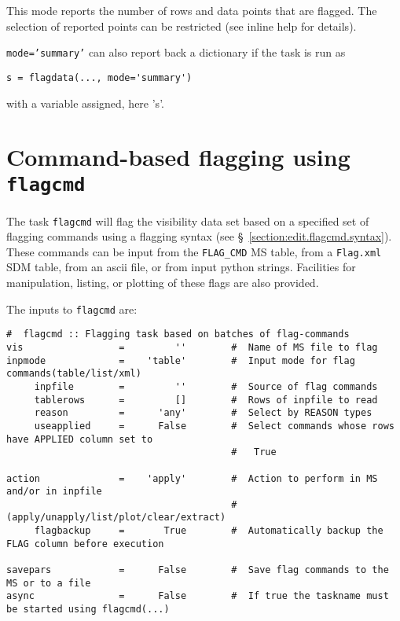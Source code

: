 This mode reports the number of rows and data points that are
flagged. The selection of reported points can be restricted (see
inline help for details).

{\tt mode='summary'} can also report back a dictionary if the task is run as 

\small
\begin{verbatim}
s = flagdata(..., mode='summary')
\end{verbatim}
\normalsize

with a variable assigned, here 's'.



\section{Command-based flagging using {\tt flagcmd}}
\label{section:edit.flagcmd}

The task {\tt flagcmd} will flag the visibility data set based on 
a specified set of flagging commands using a flagging 
syntax (see \S~\ref{section:edit.flagcmd.syntax}).  These commands
can be input from the {\tt FLAG\_CMD} MS table, from a 
{\tt Flag.xml} SDM table, from an ascii
file, or from input python strings.  Facilities for manipulation,
listing, or plotting of these flags are also provided.

The inputs to {\tt flagcmd} are:
\small
\begin{verbatim}
#  flagcmd :: Flagging task based on batches of flag-commands
vis                 =         ''        #  Name of MS file to flag
inpmode             =    'table'        #  Input mode for flag commands(table/list/xml)
     inpfile        =         ''        #  Source of flag commands
     tablerows      =         []        #  Rows of inpfile to read
     reason         =      'any'        #  Select by REASON types
     useapplied     =      False        #  Select commands whose rows have APPLIED column set to
                                        #   True

action              =    'apply'        #  Action to perform in MS and/or in inpfile
                                        #   (apply/unapply/list/plot/clear/extract)
     flagbackup     =       True        #  Automatically backup the FLAG column before execution

savepars            =      False        #  Save flag commands to the MS or to a file
async               =      False        #  If true the taskname must be started using flagcmd(...)
\end{verbatim}
\normalsize

